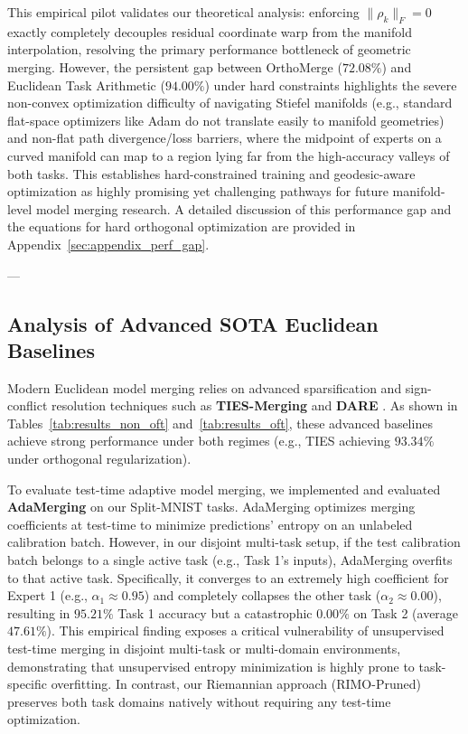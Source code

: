This empirical pilot validates our theoretical analysis: enforcing $\|\rho_k\|_F = 0$ exactly completely decouples residual coordinate warp from the manifold interpolation, resolving the primary performance bottleneck of geometric merging. However, the persistent gap between OrthoMerge ($72.08\%$) and Euclidean Task Arithmetic ($94.00\%$) under hard constraints highlights the severe non-convex optimization difficulty of navigating Stiefel manifolds (e.g., standard flat-space optimizers like Adam do not translate easily to manifold geometries) and non-flat path divergence/loss barriers, where the midpoint of experts on a curved manifold can map to a region lying far from the high-accuracy valleys of both tasks. This establishes hard-constrained training and geodesic-aware optimization as highly promising yet challenging pathways for future manifold-level model merging research. A detailed discussion of this performance gap and the equations for hard orthogonal optimization are provided in Appendix~\ref{sec:appendix_perf_gap}.

---

\subsection{Analysis of Advanced SOTA Euclidean Baselines}
\label{subsec:sota_baselines}
Modern Euclidean model merging relies on advanced sparsification and sign-conflict resolution techniques such as \textbf{TIES-Merging} \cite{ties2023} and \textbf{DARE} \cite{dare2024}. As shown in Tables~\ref{tab:results_non_oft} and~\ref{tab:results_oft}, these advanced baselines achieve strong performance under both regimes (e.g., TIES achieving $93.34\%$ under orthogonal regularization). 

To evaluate test-time adaptive model merging, we implemented and evaluated \textbf{AdaMerging} \cite{adamerging2024} on our Split-MNIST tasks. AdaMerging optimizes merging coefficients at test-time to minimize predictions' entropy on an unlabeled calibration batch. However, in our disjoint multi-task setup, if the test calibration batch belongs to a single active task (e.g., Task 1's inputs), AdaMerging overfits to that active task. Specifically, it converges to an extremely high coefficient for Expert 1 (e.g., $\alpha_1 \approx 0.95$) and completely collapses the other task ($\alpha_2 \approx 0.00$), resulting in $95.21\%$ Task 1 accuracy but a catastrophic $0.00\%$ on Task 2 (average $47.61\%$). This empirical finding exposes a critical vulnerability of unsupervised test-time merging in disjoint multi-task or multi-domain environments, demonstrating that unsupervised entropy minimization is highly prone to task-specific overfitting. In contrast, our Riemannian approach (RIMO-Pruned) preserves both task domains natively without requiring any test-time optimization.

